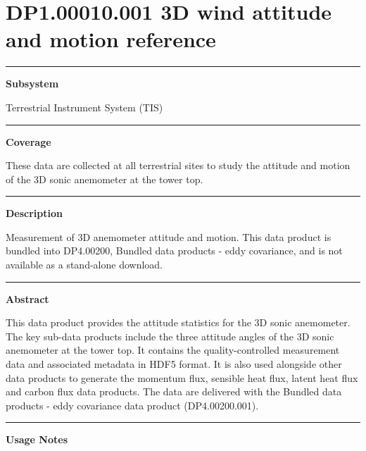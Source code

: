 \documentclass[]{article}
\begin{document}
\section{DP1.00010.001 3D wind attitude and motion
reference}\label{dp1.00010.001-3d-wind-attitude-and-motion-reference}

\begin{center}\rule{0.5\linewidth}{\linethickness}\end{center}

\textbf{Subsystem}

Terrestrial Instrument System (TIS)

\begin{center}\rule{0.5\linewidth}{\linethickness}\end{center}

\textbf{Coverage}

These data are collected at all terrestrial sites to study the attitude
and motion of the 3D sonic anemometer at the tower top.

\begin{center}\rule{0.5\linewidth}{\linethickness}\end{center}

\textbf{Description}

Measurement of 3D anemometer attitude and motion. This data product is
bundled into DP4.00200, Bundled data products - eddy covariance, and is
not available as a stand-alone download.

\begin{center}\rule{0.5\linewidth}{\linethickness}\end{center}

\textbf{Abstract}

This data product provides the attitude statistics for the 3D sonic
anemometer. The key sub-data products include the three attitude angles
of the 3D sonic anemometer at the tower top. It contains the
quality-controlled measurement data and associated metadata in HDF5
format. It is also used alongside other data products to generate the
momentum flux, sensible heat flux, latent heat flux and carbon flux data
products. The data are delivered with the Bundled data products - eddy
covariance data product (DP4.00200.001).

\begin{center}\rule{0.5\linewidth}{\linethickness}\end{center}

\textbf{Usage Notes}
\end{document}
